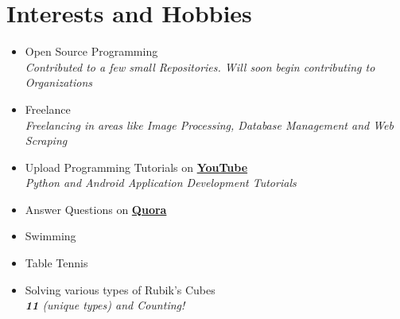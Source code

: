 \documentclass[a4paper,10pt]{article}
\begin{document}
\section{Interests and Hobbies}
\begin{itemize}
  \item Open Source Programming \\
  \emph{\small{Contributed to a few small Repositories. Will soon begin contributing to Organizations}}
  \item Freelance \\
  \emph{\small{Freelancing in areas like Image Processing, Database Management and Web Scraping}}
  \item Upload Programming Tutorials on \href{https://www.youtube.com/channel/UC5A8roRFNDmhw4jNKiQqWnQ}{\textbf{YouTube}} \\
  \emph{\small{Python and Android Application Development Tutorials}}
  \item Answer Questions on \href{https://www.quora.com/profile/Yashit-Maheshwary}{\textbf{Quora}}
  \item Swimming
  \item Table Tennis
  \item Solving various types of Rubik's Cubes \\
  \emph{\normalsize{\textbf{11}} \small{(unique types) and Counting!}}
\end{itemize}
\end{document}
